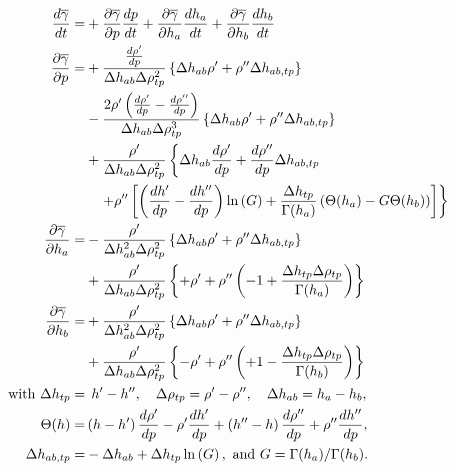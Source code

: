 {\newcommand{\dhab}{\Delta h_{ab}}
\newcommand{\dhtp}{\Delta h_{tp}}
\newcommand{\drtp}{\Delta \rho_{tp}}
\newcommand{\dhabtp}{\Delta h_{ab,tp}}

\begin{align}
\frac{d\overline{\gamma}}{dt}  =& + \frac{\partial \overline{\gamma}}{\partial p}\frac{dp}{dt} + \frac{\partial \overline{\gamma}}{\partial h_a}\frac{dh_a}{dt} + \frac{\partial \overline{\gamma}}{\partial h_b}\frac{dh_b}{dt} \label{eqn:dgammabardt} \\
%
\frac{\partial \overline{\gamma}}{\partial p}=&+{\frac{\frac{d\rhop}{dp}}{\dhab\drtp^2}\left\lbrace{\dhab\rhop+\rhopp\dhabtp}\right\rbrace}\nonumber\\
&-{\frac{2\rhop\left(\frac{d\rhop}{dp}-\frac{d\rhopp}{dp}\right)}{\dhab\drtp^3}\left\lbrace{\dhab\rhop+\rhopp\dhabtp}\right\rbrace}\nonumber\\
&+{\frac\rhop{\dhab\drtp^2}\left\lbrace{{\dhab{\frac{d\rhop}{dp}}}+\frac{d\rhopp}{dp}\dhabtp}\right.}\nonumber\\
&\quad\left.{+\rhopp\left[{\left({\frac{d\hp}{dp}-\frac{d\hpp}{dp}}\right)\ln\left({G}\right)+\frac{\dhtp}{\Gamma(h_a)}\left({\Theta(h_a)-G\Theta(h_b)}\right)}\right]}\right\rbrace
%
\label{eqn:dgammabardp}\\
%
\frac{\partial \overline{\gamma}}{\partial h_a}=&
-{\frac\rhop{\dhab^{2}\drtp^{2}}\left\lbrace{\dhab\rhop+\rhopp\dhabtp}\right\rbrace}\nonumber\\
&+{\frac\rhop{\dhab\drtp^{2}}\left\lbrace+\rhop+\rhopp\left(-1+\frac{\dhtp\drtp}{\Gamma(h_a)}\right)\right\rbrace}\label{eqn:dgammabardha}\\
%
\frac{\partial \overline{\gamma}}{\partial h_b}=&
+{\frac\rhop{\dhab^{2}\drtp^{2}}\left\lbrace{\dhab\rhop+\rhopp\dhabtp}\right\rbrace}\nonumber\\
&+{\frac\rhop{\dhab\drtp^{2}}\left\lbrace-\rhop+\rhopp\left(+1-\frac{\dhtp\drtp}{\Gamma(h_b)}\right)\right\rbrace}\label{eqn:dgammabardhb}\\
%
\text{ with } 
\dhtp     =&\;\, \hp-\hpp, \quad \drtp = \rhop-\rhopp, \quad \dhab = h_a-h_b, \nonumber\\
\Theta(h) =& \left(h-\hp\right)\frac{d\rhop}{dp}-\rhop\frac{d\hp}{dp}+\left(\hpp-h\right)\frac{d\rhopp}{dp}+\rhopp\frac{d\hpp}{dp}, \nonumber\\
\dhabtp   =& -\dhab+\dhtp\ln\left(G\right), \text{ and } G = \Gamma(h_a) / \Gamma(h_b) \text{. } \nonumber
\end{align}



}
